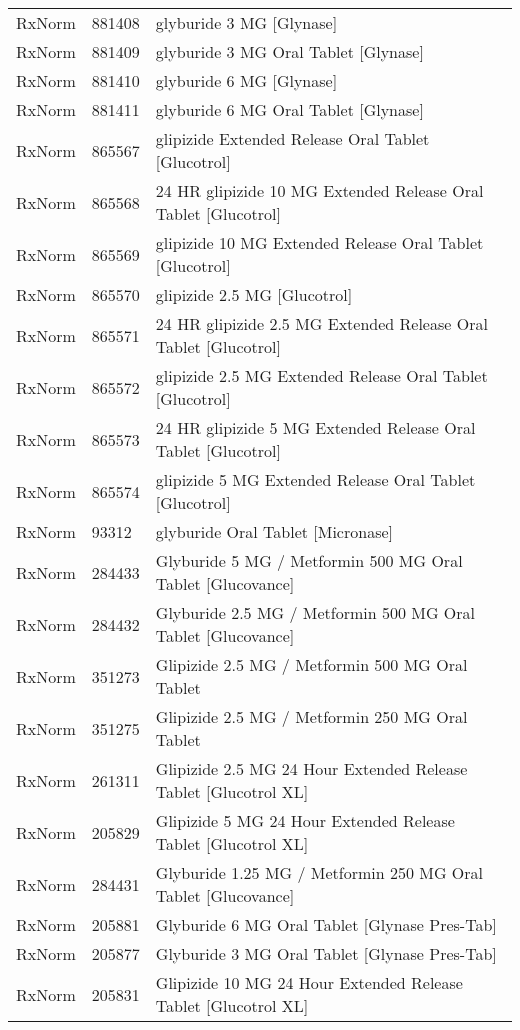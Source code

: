 \begin{longtable}{p{}p{}p{}}
  RxNorm & 881408 & glyburide 3 MG [Glynase] \\ 
  RxNorm & 881409 & glyburide 3 MG Oral Tablet [Glynase] \\ 
  RxNorm & 881410 & glyburide 6 MG [Glynase] \\ 
  RxNorm & 881411 & glyburide 6 MG Oral Tablet [Glynase] \\ 
  RxNorm & 865567 & glipizide Extended Release Oral Tablet [Glucotrol] \\ 
  RxNorm & 865568 & 24 HR glipizide 10 MG Extended Release Oral Tablet [Glucotrol] \\ 
  RxNorm & 865569 & glipizide 10 MG Extended Release Oral Tablet [Glucotrol] \\ 
  RxNorm & 865570 & glipizide 2.5 MG [Glucotrol] \\ 
  RxNorm & 865571 & 24 HR glipizide 2.5 MG Extended Release Oral Tablet [Glucotrol] \\ 
  RxNorm & 865572 & glipizide 2.5 MG Extended Release Oral Tablet [Glucotrol] \\ 
  RxNorm & 865573 & 24 HR glipizide 5 MG Extended Release Oral Tablet [Glucotrol] \\ 
  RxNorm & 865574 & glipizide 5 MG Extended Release Oral Tablet [Glucotrol] \\ 
  RxNorm & 93312 & glyburide Oral Tablet [Micronase] \\ 
  RxNorm & 284433 & Glyburide 5 MG / Metformin 500 MG Oral Tablet [Glucovance] \\ 
  RxNorm & 284432 & Glyburide 2.5 MG / Metformin 500 MG Oral Tablet [Glucovance] \\ 
  RxNorm & 351273 & Glipizide 2.5 MG / Metformin 500 MG Oral Tablet \\ 
  RxNorm & 351275 & Glipizide 2.5 MG / Metformin 250 MG Oral Tablet \\ 
  RxNorm & 261311 & Glipizide 2.5 MG 24 Hour Extended Release Tablet [Glucotrol XL] \\ 
  RxNorm & 205829 & Glipizide 5 MG 24 Hour Extended Release Tablet [Glucotrol XL] \\ 
  RxNorm & 284431 & Glyburide 1.25 MG / Metformin 250 MG Oral Tablet [Glucovance] \\ 
  RxNorm & 205881 & Glyburide 6 MG Oral Tablet [Glynase Pres-Tab] \\ 
  RxNorm & 205877 & Glyburide 3 MG Oral Tablet [Glynase Pres-Tab] \\ 
  RxNorm & 205831 & Glipizide 10 MG 24 Hour Extended Release Tablet [Glucotrol XL] \\ 

\end{longtable}
